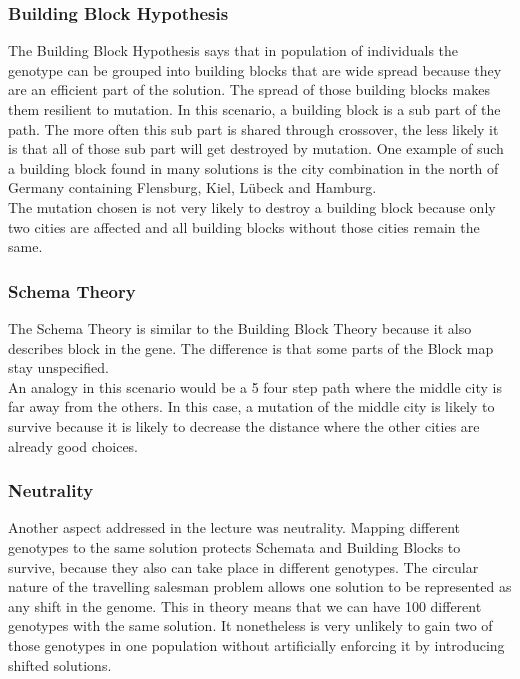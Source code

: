 \documentclass{scrartcl}
\begin{document}
\subsubsection{Building Block Hypothesis}
The Building Block Hypothesis says that in population of individuals the genotype can be grouped into building blocks that are wide spread because they are an efficient part of the solution. The spread of those building blocks makes them resilient to mutation. In this scenario, a building block is a sub part of the path. The more often this sub part is shared through crossover, the less likely it is that all of those sub part will get destroyed by mutation. One example of such a building block found in many solutions is the city combination in the north of Germany containing Flensburg, Kiel, Lübeck and Hamburg.\\
The mutation chosen is not very likely to destroy a building block because only two cities are affected and all building blocks without those cities remain the same.
\subsubsection{Schema Theory}
The Schema Theory is similar to the Building Block Theory because it also describes block in the gene. The difference is that some parts of the Block map stay unspecified.\\
An analogy in this scenario would be a 5 four step path where the middle city is far away from the others. In this case, a mutation of the middle city is likely to survive because it is likely to decrease the distance where the other cities are already good choices.
 
 \subsubsection{Neutrality}
Another aspect addressed in the lecture was neutrality. Mapping different genotypes to the same solution protects Schemata and Building Blocks to survive, because they also can take place in different genotypes. The circular nature of the travelling salesman problem allows one solution to be represented as any shift in the genome. This in theory means that we can have 100 different genotypes with the same solution. It nonetheless is very unlikely to gain two of those genotypes in one population without artificially enforcing it by introducing shifted solutions.
\end{document}
